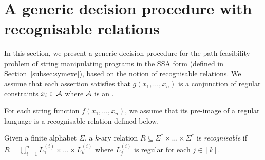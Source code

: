 

\section{A generic decision procedure with recognisable relations} \label{sec:algo}

In this section,  we present a generic decision procedure for the path feasibility problem %
of string manipulating programs in the SSA form (defined in Section~\ref{subsec:symexe}), 
based on the notion of recognisable relations. We assume that each assertion  satisfies that $g(x_1,\ldots,x_n)$ is a conjunction of regular constraints
 $x_i \in \mathcal{A}$ where $\mathcal{A}$ is an \FA{}.   

%
%

For each string function $f(x_1,\ldots,x_n)$, we assume that its pre-image of a regular language is a recognisable relation defined below.  

\begin{definition}
	Given a finite alphabet $\Sigma$, a $k$-ary relation $R\subseteq \Sigma^*\times \ldots\times \Sigma^*$ is \emph{recognisable}  if $R=\bigcup_{i=1}^n L^{(i)}_1\times \ldots\times L^{(i)}_k$ where $L^{(i)}_j$ is regular for each $j\in [k]$.
%
\end{definition}


